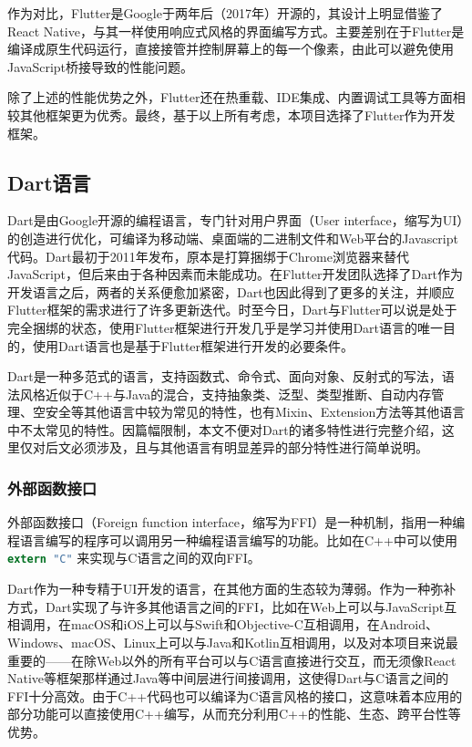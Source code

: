 作为对比，Flutter是Google于两年后（2017年）开源的，其设计上明显借鉴了React Native，与其一样使用响应式风格的界面编写方式。主要差别在于Flutter是编译成原生代码运行，直接接管并控制屏幕上的每一个像素，由此可以避免使用JavaScript桥接导致的性能问题。

除了上述的性能优势之外，Flutter还在热重载、IDE集成、内置调试工具等方面相较其他框架更为优秀。最终，基于以上所有考虑，本项目选择了Flutter作为开发框架。

\subsection{Dart语言}\label{subsec:dart}

Dart是由Google开源的编程语言，专门针对用户界面（User interface，缩写为UI）的创造进行优化，可编译为移动端、桌面端的二进制文件和Web平台的Javascript代码\cite{DartProgrammingLanguage}。Dart最初于2011年发布，原本是打算捆绑于Chrome浏览器来替代JavaScript，但后来由于各种因素而未能成功。在Flutter开发团队选择了Dart作为开发语言之后，两者的关系便愈加紧密，Dart也因此得到了更多的关注，并顺应Flutter框架的需求进行了许多更新迭代。时至今日，Dart与Flutter可以说是处于完全捆绑的状态，使用Flutter框架进行开发几乎是学习并使用Dart语言的唯一目的，使用Dart语言也是基于Flutter框架进行开发的必要条件。

Dart是一种多范式的语言，支持函数式、命令式、面向对象、反射式的写法，语法风格近似于C++与Java的混合，支持抽象类、泛型、类型推断、自动内存管理、空安全等其他语言中较为常见的特性，也有Mixin、Extension方法等其他语言中不太常见的特性。因篇幅限制，本文不便对Dart的诸多特性进行完整介绍，这里仅对后文必须涉及，且与其他语言有明显差异的部分特性进行简单说明。

\subsubsection{外部函数接口}\label{subsubsec:ffi}

外部函数接口（Foreign function interface，缩写为FFI）是一种机制，指用一种编程语言编写的程序可以调用另一种编程语言编写的功能。比如在C++中可以使用 \lstinline[language=C]{extern "C"} 来实现与C语言之间的双向FFI。

Dart作为一种专精于UI开发的语言，在其他方面的生态较为薄弱。作为一种弥补方式，Dart实现了与许多其他语言之间的FFI，比如在Web上可以与JavaScript互相调用，在macOS和iOS上可以与Swift和Objective-C互相调用，在Android、Windows、macOS、Linux上可以与Java和Kotlin互相调用，以及对本项目来说最重要的——在除Web以外的所有平台可以与C语言直接进行交互，而无须像React Native等框架那样通过Java等中间层进行间接调用，这使得Dart与C语言之间的FFI十分高效。由于C++代码也可以编译为C语言风格的接口，这意味着本应用的部分功能可以直接使用C++编写，从而充分利用C++的性能、生态、跨平台性等优势。

